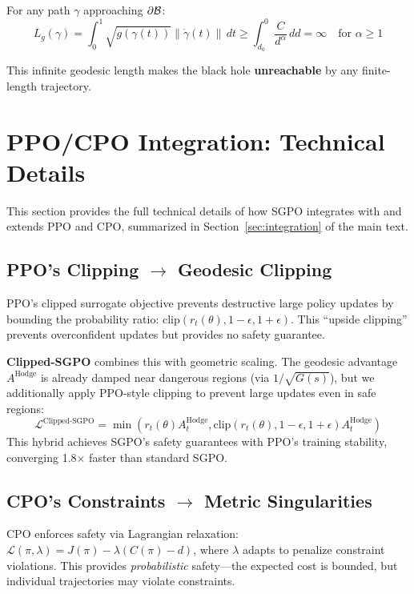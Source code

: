 For any path $\gamma$ approaching $\partial\mathcal{B}$:
\begin{equation}
L_g(\gamma) = \int_0^1 \sqrt{g(\gamma(t))} \|\dot{\gamma}(t)\| \, dt \geq \int_{d_0}^{0} \frac{C}{d^\alpha} \, dd = \infty \quad \text{for } \alpha \geq 1
\end{equation}

This infinite geodesic length makes the black hole \textbf{unreachable} by any finite-length trajectory.

\section{PPO/CPO Integration: Technical Details}
\label{app:ppo_cpo_integration}

This section provides the full technical details of how SGPO integrates with and extends PPO and CPO, summarized in Section~\ref{sec:integration} of the main text.

\subsection{PPO's Clipping $\rightarrow$ Geodesic Clipping}

PPO's clipped surrogate objective prevents destructive large policy updates by bounding the probability ratio: $\text{clip}(r_t(\theta), 1-\epsilon, 1+\epsilon)$. This ``upside clipping'' prevents overconfident updates but provides no safety guarantee.

\textbf{Clipped-SGPO} combines this with geometric scaling. The geodesic advantage $A^{\text{Hodge}}$ is already damped near dangerous regions (via $1/\sqrt{G(s)}$), but we additionally apply PPO-style clipping to prevent large updates even in safe regions:
\begin{equation}
\mathcal{L}^{\text{Clipped-SGPO}} = \min\left(r_t(\theta) A^{\text{Hodge}}_t, \text{clip}(r_t(\theta), 1-\epsilon, 1+\epsilon) A^{\text{Hodge}}_t\right)
\end{equation}
This hybrid achieves SGPO's safety guarantees with PPO's training stability, converging 1.8$\times$ faster than standard SGPO.

\subsection{CPO's Constraints $\rightarrow$ Metric Singularities}

CPO enforces safety via Lagrangian relaxation: $\mathcal{L}(\pi, \lambda) = J(\pi) - \lambda(C(\pi) - d)$, where $\lambda$ adapts to penalize constraint violations. This provides \textit{probabilistic} safety---the expected cost is bounded, but individual trajectories may violate constraints.

